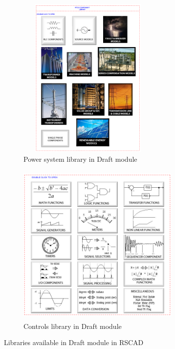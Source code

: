 \begin{figure}[H]
\centering
\begin{subfigure}{.5\textwidth}
  \centering
  \includegraphics[height=8cm,width=7cm]{Diagrams/Chapter_3/Power_system_lib.PNG}
  \caption{Power system library in Draft module}
  \label{fig:Power_system_lib}
\end{subfigure}%
\begin{subfigure}{.5\textwidth}
  \centering
  \includegraphics[height=8cm,width=8cm]{Diagrams/Chapter_3/Control_system_lib.PNG}
  \caption{Controls library in Draft module}
  \label{fig:Controls_lib}
\end{subfigure}
\caption{Libraries available in Draft module in RSCAD}
\end{figure}


